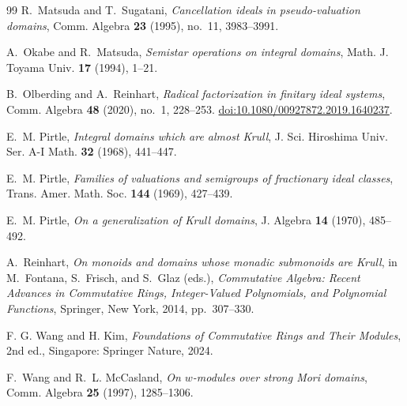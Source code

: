 \documentclass[11pt]{amsart}
\theoremstyle{definition}
\theoremstyle{remark}
\begin{document}
\begin{thebibliography}{99}
R.~Matsuda and T.~Sugatani,
\emph{Cancellation ideals in pseudo-valuation domains},
Comm. Algebra \textbf{23} (1995), no.~11, 3983--3991.

A.~Okabe and R.~Matsuda,
\emph{Semistar operations on integral domains},
Math. J. Toyama Univ. \textbf{17} (1994), 1--21.

B.~Olberding and A.~Reinhart,
\emph{Radical factorization in finitary ideal systems},
Comm. Algebra \textbf{48} (2020), no.~1, 228--253.
\href{https://doi.org/10.1080/00927872.2019.1640237}{doi:10.1080/00927872.2019.1640237}.

E.~M. Pirtle,
\emph{Integral domains which are almost Krull},
J. Sci. Hiroshima Univ. Ser. A-I Math. \textbf{32} (1968), 441--447.

E.~M. Pirtle,
\emph{Families of valuations and semigroups of fractionary ideal classes},
Trans. Amer. Math. Soc. \textbf{144} (1969), 427--439.

E.~M. Pirtle,
\emph{On a generalization of Krull domains},
J. Algebra \textbf{14} (1970), 485--492.

A.~Reinhart,
\emph{On monoids and domains whose monadic submonoids are Krull},
in M.~Fontana, S.~Frisch, and S.~Glaz (eds.),
\emph{Commutative Algebra: Recent Advances in Commutative Rings,
Integer-Valued Polynomials, and Polynomial Functions},
Springer, New York, 2014, pp.~307--330.

 F. G. Wang and H. Kim, \textit{Foundations of Commutative Rings and Their Modules}, 2nd ed., Singapore: Springer Nature, 2024.

F.~Wang and R.~L. McCasland,
\emph{On $w$-modules over strong Mori domains},
Comm. Algebra \textbf{25} (1997), 1285--1306.

\enlargethispage{4\baselineskip}
\end{thebibliography}
\end{document}
